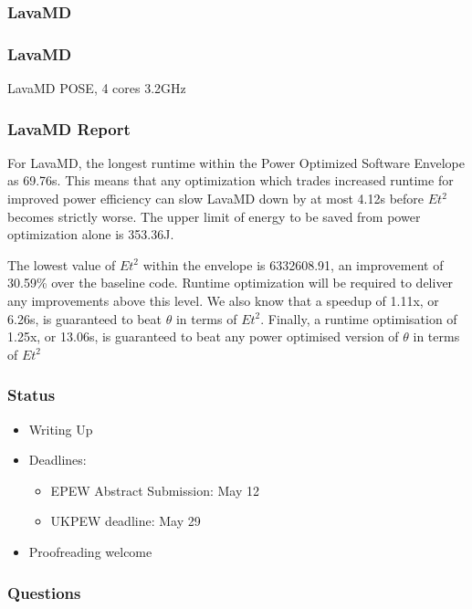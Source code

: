 \documentclass{beamer}
\begin{document}
  \begin{frame}
    \frametitle{LavaMD}
    \begin{figure}
    \providecommand{\plotwidth}{.8\linewidth}
    
    \end{figure}
  \end{frame}
  \begin{frame}
    \frametitle{LavaMD}
    \begin{table}
    
    \caption{LavaMD POSE, 4 cores 3.2GHz}
    \end{table} 
  \end{frame}

  \begin{frame}
    \frametitle{LavaMD Report}
For LavaMD, the longest runtime within the Power Optimized Software Envelope as 69.76s.
This means that any optimization which trades increased runtime for improved power efficiency can slow LavaMD down by at most 4.12s before $Et^2$ becomes strictly worse.
The upper limit of energy to be saved from power optimization alone is 353.36J.

The lowest value of $Et^2$ within the envelope is 6332608.91, an improvement of 30.59\% over the baseline code.
Runtime optimization will be required to deliver any improvements above this level.
We also know that a speedup of 1.11x, or 6.26s, is guaranteed to beat $\theta$ in terms of $Et^2$.
Finally, a runtime optimisation of 1.25x, or 13.06s, is guaranteed to beat any power optimised version of $\theta$ in terms of $Et^2$ 
\end{frame}

  \begin{frame}
    \frametitle{Status}
    \begin{itemize}
    \item Writing Up
    \item Deadlines:
    \begin{itemize}
      \item EPEW Abstract Submission: May 12 
      \item UKPEW deadline: May 29
    \end{itemize}
    \item Proofreading welcome
    \end{itemize}
  \end{frame}


  \begin{frame}
    \frametitle{Questions}
  \end{frame}
\end{document}
